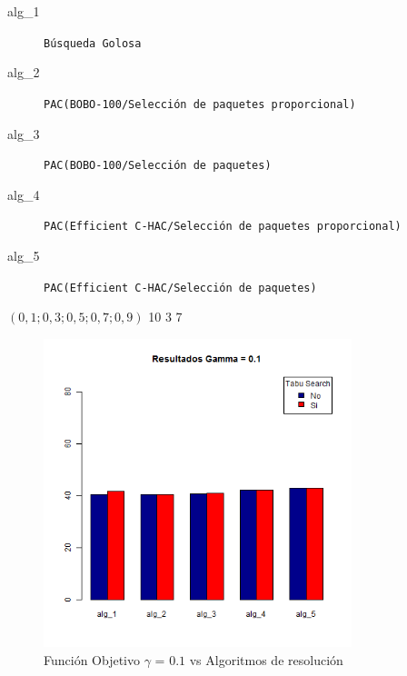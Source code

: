 \SolucionBudget
{}
{
\begin{description}
	\item[alg\_1] \texttt{Búsqueda Golosa}
	\item[alg\_2] \texttt{PAC(BOBO-100/Selección de paquetes proporcional)}
	\item[alg\_3] \texttt{PAC(BOBO-100/Selección de paquetes)}
	\item[alg\_4] \texttt{PAC(Efficient C-HAC/Selección de paquetes proporcional)}
	\item[alg\_5] \texttt{PAC(Efficient C-HAC/Selección de paquetes)}
\end{description}
}
{$(0,1; 0,3; 0,5; 0,7; 0,9)$}
{10}
{3}
{7}

\begin{figure}[H]
  \centering
    \includegraphics[width=0.8\textwidth]{resultados/cities/Graficos_agrupados/gamma01-cities.png}
  \caption{Función Objetivo $\gamma$ = $0.1$ vs Algoritmos de resolución}
  \label{res:img-cities-agr-gamma01}
\end{figure}

